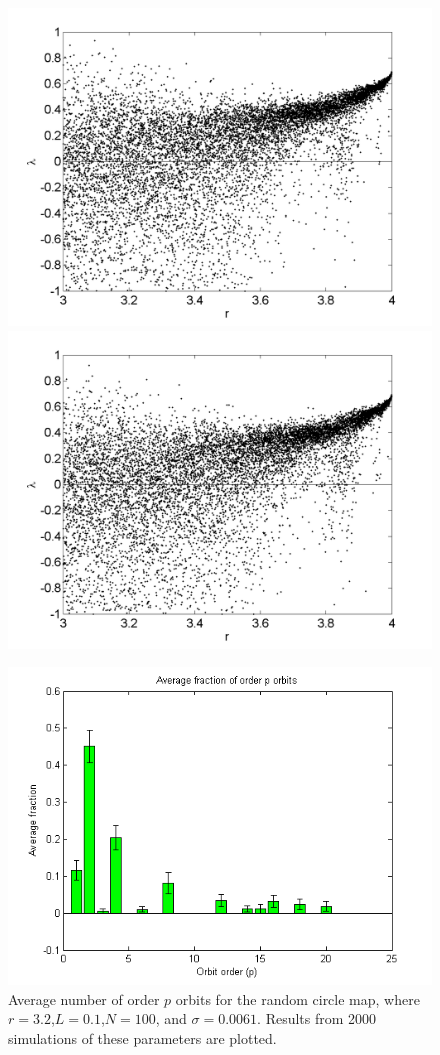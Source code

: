 \begin{figure}[!h]
\includegraphics[width=.5\textwidth]{figs/rlog_lyap_L_07.png}\hfill
\includegraphics[width=.5\textwidth]{figs/rlog_lyap_L_09.png}\\
\end{figure}

\begin{figure}[H]\linespread{1}
\caption[Average number of order $p$ orbits for the random circle
map]{Average number of order $p$ orbits for the random circle
map, where $r =3.2$,$L=0.1$,$N=100$, and $\sigma = 0.0061$. Results from 2000
simulations of these parameters are plotted.}
	\begin{center}
          \includegraphics[scale=0.7]{figs/rlog_hist_r32_L01.png}
	\end{center}
\end{figure}

